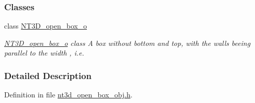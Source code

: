 \subsubsection*{Classes}
\begin{DoxyCompactItemize}
\item 
class \hyperlink{class_n_t3_d__open__box__o}{NT3D\_\-open\_\-box\_\-o}
\begin{DoxyCompactList}\small\item\em \hyperlink{class_n_t3_d__open__box__o}{NT3D\_\-open\_\-box\_\-o} class A box without bottom and top, with the walls beeing parallel to the width , i.e. \item\end{DoxyCompactList}\end{DoxyCompactItemize}


\subsubsection{Detailed Description}


Definition in file \hyperlink{nt3d__open__box__obj_8h_source}{nt3d\_\-open\_\-box\_\-obj.h}.


